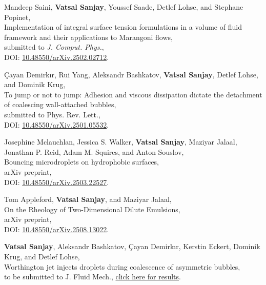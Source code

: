 \documentclass[10pt,a4paper,colorlinks,linkcolor=blue,urlcolor=blue,citecolor=blue]{moderncv}
\begin{document}
\begin{enumerate}[leftmargin=1.5em,label=\textbf{[\arabic*]}]
	\item Mandeep Saini, \textbf{Vatsal Sanjay}, Youssef Saade, Detlef Lohse, and Stephane Popinet,\\
	Implementation of integral surface tension formulations in a volume of fluid framework and their applications to Marangoni flows,\\
	submitted to \textit{J. Comput. Phys.},\\
	\vspace{2pt}
	\faFile\hspace{0.2em}DOI: \href{https://doi.org/10.48550/arXiv.2502.02712}{10.48550/arXiv.2502.02712}.

	\item Çayan Demirkır, Rui Yang, Aleksandr Bashkatov, \textbf{Vatsal Sanjay}, Detlef Lohse, and Dominik Krug,\\
	To jump or not to jump: Adhesion and viscous dissipation dictate the detachment of coalescing wall-attached bubbles,\\
	submitted to Phys. Rev. Lett.,\\
	\faFile\hspace{0.2em}DOI: \href{https://doi.org/10.48550/arXiv.2501.05532}{10.48550/arXiv.2501.05532}.

	\item Josephine Mclauchlan, Jessica S. Walker, \textbf{Vatsal Sanjay}, Maziyar Jalaal, Jonathan P. Reid, Adam M. Squires, and Anton Souslov,\\
	Bouncing microdroplets on hydrophobic surfaces,\\
	arXiv preprint,\\
	\faFile\hspace{0.2em}DOI: \href{https://doi.org/10.48550/arXiv.2503.22527}{10.48550/arXiv.2503.22527}.

	\item Tom Appleford, \textbf{Vatsal Sanjay}, and Maziyar Jalaal,\\
	On the Rheology of Two-Dimensional Dilute Emulsions,\\
	arXiv preprint,\\
	\faFile\hspace{0.2em}DOI: \href{https://doi.org/10.48550/arXiv.2508.13022}{10.48550/arXiv.2508.13022}.

	\item \textbf{Vatsal Sanjay}, Aleksandr Bashkatov, Çayan Demirkır, Kerstin Eckert, Dominik Krug, and Detlef Lohse,\\
	Worthington jet injects droplets during coalescence of asymmetric bubbles,\\
	to be submitted to J. Fluid Mech., \href{https://youtu.be/WZonMHzzkXQ}{click here for results}.


\end{enumerate}
\end{document}
